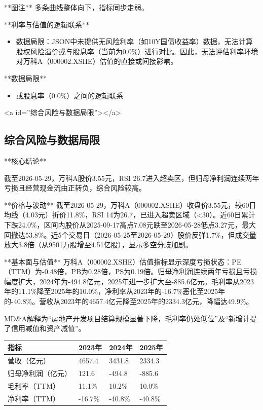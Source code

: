 \documentclass[12pt,a4paper]{article}
\begin{document}
**图注** 多条曲线整体向下，指标同步走弱。

**利率与估值的逻辑联系**
\begin{itemize}
\item 数据局限：JSON中未提供无风险利率（如10Y国债收益率）数据，无法计算股权风险溢价或与股息率（当前为0.0\%）进行对比。因此，无法评估利率环境对万科A（000002.XSHE）估值的直接或间接影响。
\end{itemize}

**数据局限**

\begin{itemize}
\item 或股息率（0.0\%）之间的逻辑联系
\end{itemize}

<a id=''综合风险与数据局限''></a>

\subsection{ 综合风险与数据局限}

**核心结论**

截至2026-05-29，万科A股价3.55元，RSI 26.7进入超卖区，但归母净利润连续两年亏损且经营现金流由正转负，综合风险较高。

**价格与波动**
截至2026-05-29，万科A（000002.XSHE）收盘价3.55元，较60日均线（4.03元）折价11.8\%，RSI 14为26.7，已进入超卖区域（<30）。近60日累计下跌24.0\%，区间内股价从2025-09-17高点7.08元跌至2026-05-28低点3.27元，最大回撤达53.8\%。近5个交易日（2026-05-25至2026-05-29）股价反弹1.7\%，但成交量放大3.8倍（从9501万股增至4.51亿股），显示多空分歧加剧。

**基本面与估值**
万科A（000002.XSHE）估值指标显示深度亏损状态：PE（TTM）为-0.48倍，PB为0.28倍，PS为0.19倍。归母净利润连续两年亏损且亏损幅度扩大，2024年为-494.8亿元，2025年进一步扩大至-885.6亿元。毛利率从2023年的11.1\%降至2025年的10.0\%，净利率从2023年的-16.7\%恶化至2025年的-40.8\%。营收从2023年的4657.4亿元降至2025年的2334.3亿元，降幅达49.9\%。

MD\&A解释为“房地产开发项目结算规模显著下降，毛利率仍处低位”及“新增计提了信用减值和资产减值”。

\begin{table}[htbp]
\centering
\begin{tabular}{llll}
\toprule
指标 & 2023年 & 2024年 & 2025年 \\
\midrule
营收（亿元） & 4657.4 & 3431.8 & 2334.3 \\
归母净利润（亿元） & 121.6 & -494.8 & -885.6 \\
毛利率（TTM） & 11.1\% & 10.2\% & 10.0\% \\
净利率（TTM） & -16.7\% & -40.8\% & -40.8\% \\
\bottomrule
\end{tabular}
\end{table}
\end{document}
